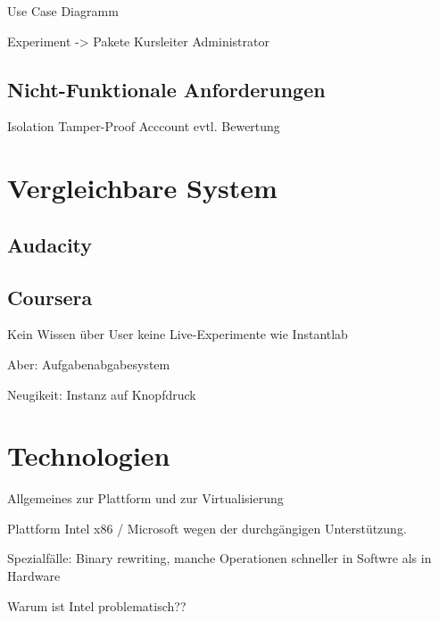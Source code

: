 		Use Case Diagramm

		Experiment -> Pakete
		Kursleiter
		Administrator
				
		\subsection{Nicht-Funktionale Anforderungen}

		Isolation
		Tamper-Proof
		Acccount
		evtl. Bewertung

	

\section{Vergleichbare System}
\label{sec:solutions}
		
		\subsection{Audacity}
		\subsection{Coursera}

		Kein Wissen über User
		keine Live-Experimente wie Instantlab

		Aber: Aufgabenabgabesystem
		
		Neugikeit: Instanz auf Knopfdruck
		
\section{Technologien}
\label{sec:technologies}

		Allgemeines zur Plattform und zur Virtualisierung

		Plattform Intel x86 / Microsoft wegen der durchgängigen Unterstützung. \cite{PopekGoldberg}

		Spezialfälle: Binary rewriting, manche Operationen schneller in Softwre als in Hardware

		Warum ist Intel problematisch??

